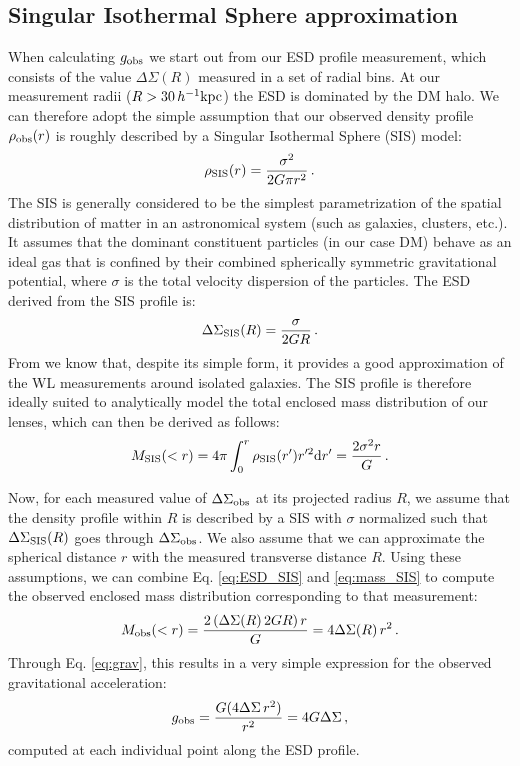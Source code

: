 \documentclass[usenatbib]{mnras}
\newcommand{\hkpc}{\, h^{-1}{\rm{kpc}} }
\newcommand{\un}[1]{_{\rm #1}}
\begin{document}
\subsection{Singular Isothermal Sphere approximation}
\label{sec:SIS_approximation}

When calculating $g\un{obs}$ we start out from our ESD profile measurement, which consists of the value $\Delta\Sigma(R)$ measured in a set of radial bins. At our measurement radii ($R>30\hkpc$) the ESD is dominated by the DM halo. We can therefore adopt the simple assumption that our observed density profile $\rho\un{obs}(r)$ is roughly described by a Singular Isothermal Sphere (SIS) model:
\begin{equation}\label{eq:rho_SIS}
	\rho\un{SIS}(r) = \frac{\sigma^2}{2 G \pi r^2} \, . 
\end{equation}
The SIS is generally considered to be the simplest parametrization of the spatial distribution of matter in an astronomical system (such as galaxies, clusters, etc.). It assumes that the dominant constituent particles (in our case DM) behave as an ideal gas that is confined by their combined spherically symmetric gravitational potential, where $\sigma$ is the total velocity dispersion of the particles. The ESD derived from the SIS profile is:
\begin{equation}\label{eq:ESD_SIS}
\Delta\Sigma\un{SIS}(R) = \frac{\sigma}{2 G R} \, .
\end{equation}
From \cite{brouwer2017} we know that, despite its simple form, it provides a good approximation of the WL measurements around isolated galaxies. The SIS profile is therefore ideally suited to analytically model the total enclosed mass distribution of our lenses, which can then be derived as follows:
\begin{equation}\label{eq:mass_SIS}
	M\un{SIS}(<r) = 4 \pi \int_{0}^{r}\rho\un{SIS}(r') r'^2 {\rm d} r' = \frac{2\sigma^2 r}{G} \, .
\end{equation}

Now, for each measured value of $\Delta\Sigma\un{obs}$ at its projected radius $R$, we assume that the density profile within $R$ is described by a SIS with $\sigma$ normalized such that $\Delta\Sigma\un{SIS}(R)$ goes through $\Delta\Sigma\un{obs}$. We also assume that we can approximate the spherical distance $r$ with the measured transverse distance $R$. Using these assumptions, we can combine Eq. \ref{eq:ESD_SIS} and \ref{eq:mass_SIS} to compute the observed enclosed mass distribution corresponding to that measurement:
\begin{equation}\label{eq:Mobs}
	M\un{obs}(<r) = \frac{2 \, (\Delta\Sigma(R) \, 2 G R) \, r}{G} = 4 \Delta\Sigma(R) \, r^2 \, .
\end{equation}
Through Eq. \ref{eq:grav}, this results in a very simple expression for the observed gravitational acceleration:
\begin{equation}
g\un{obs} = \frac{G (4 \Delta\Sigma \, r^2)}{r^2} = 4 G \Delta\Sigma \, ,
\end{equation}
computed at each individual point along the ESD profile.
\end{document}
